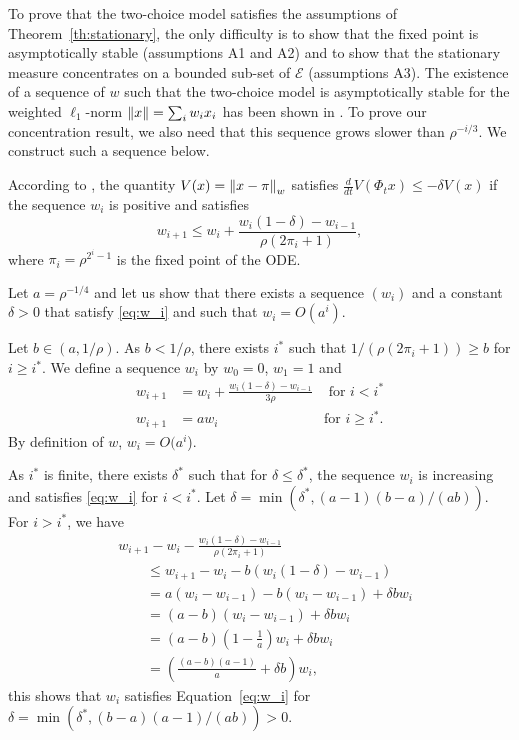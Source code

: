 \documentclass[acmlarge]{acmart}
\newcommand\E{\mathcal{E}}
\newcommand\norm[1]{{\mathchoice{\bnorm{#1}}{\snorm{#1}}{\snorm{#1}}{\snorm{#1}}}}
\newcommand\bnorm[1]{\left\|#1\right\|}
\newcommand\snorm[1]{\|#1\|}
\newcommand\dt{\frac{d}{dt}}
\newcommand\p[1]{\left(#1\right)}
\begin{document}
To prove that the two-choice model satisfies the assumptions of
Theorem~\ref{th:stationary}, the only difficulty is to show that the
fixed point is asymptotically stable (assumptions A1 and A2) and to
show that the stationary measure concentrates on a bounded sub-set of
$\E$ (assumptions A3).  The existence of a sequence of $w$ such that
the two-choice model is asymptotically stable for the weighted
$\ell_1$-norm $\norm{x}=\sum_i w_i x_i$ has been shown in
\cite[Theorem~3.6]{mitzenmacher1996power}. To prove our concentration
result, we also need that this sequence grows slower than
$\rho^{-i/3}$. We construct such a sequence below.

According to \cite[Proof of Theorem~3.6]{mitzenmacher1996power}, the
quantity $V(x)=\norm{x-\pi}_w$ satisfies
$\dt V(\Phi_tx)\le -\delta V(x)$ if the sequence $w_i$ is positive and
satisfies
\begin{equation}
  \label{eq:w_i}
  w_{i+1} \le w_i + \frac{w_i(1-\delta) - w_{i-1}}{\rho
    (2\pi_i+1)},
\end{equation}
where $\pi_i=\rho^{2^i-1}$ is the fixed point of the ODE. 

Let $a=\rho^{-1/4}$ 
and let us show that there exists a sequence
$(w_i)$ and a constant $\delta>0$ that satisfy \eqref{eq:w_i} and such
that $w_i=O(a^i)$.

Let $b\in(a,1/\rho)$. As $b<1/\rho$, there exists $i^*$ such
that $1/(\rho (2\pi_i+1))\ge b$ for $i\ge i^*$. We define a
sequence $w_i$ by $w_0=0$, $w_1=1$ and
\begin{align*}
  w_{i+1} &= w_i+\frac{w_i(1-\delta) - w_{i-1}}{3\rho} 
  &\text{ for $i<i^*$}\\
  w_{i+1} &= aw_i  &\text{for $i\ge i^*$}. 
\end{align*}
By definition of $w$, $w_i=O(a^i$).

As $i^*$ is finite, there exists $\delta^*$ such that for
$\delta\le\delta^*$, the sequence $w_i$ is increasing and satisfies
\eqref{eq:w_i} for $i<i^*$. Let
$\delta=\min(\delta^*,(a-1)(b-a)/(ab))$.  For $i>i^*$, we have
\begin{align*}
  &w_{i+1} - w_i - \frac{w_i(1-\delta)-w_{i-1}}{\rho(2\pi_i+1)} \\
  &\qquad\le w_{i+1}-w_i - b (w_i(1-\delta)-w_{i-1})\\
  &\qquad= a(w_i-w_{i-1}) - b (w_i-w_{i-1}) + \delta b w_{i}\\
  &\qquad= (a-b)(w_i-w_{i-1}) + \delta b w_i \\
  &\qquad= (a-b)\p{1-\frac1a} w_i + \delta b w_i \\
  &\qquad= \p{\frac{(a-b)(a-1)}{a} + \delta b} w_i,
\end{align*}
this shows that $w_i$ satisfies Equation~\eqref{eq:w_i} for
$\delta=\min(\delta^*,(b-a)(a-1)/(ab))>0$.
\end{document}
